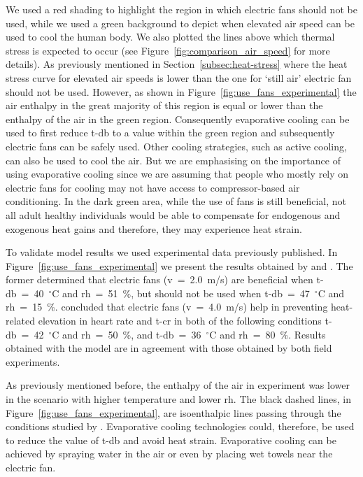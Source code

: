 We used a red shading to highlight the region in which electric fans should not be used, while we used a green background to depict when elevated air speed can be used to cool the human body.
We also plotted the lines above which thermal stress is expected to occur (see Figure~\ref{fig:comparison_air_speed} for more details).
As previously mentioned in Section~\ref{subsec:heat-stress} where the heat stress curve for elevated air speeds is lower than the one for `still air' electric fan should not be used.
 However, as shown in Figure~\ref{fig:use_fans_experimental} the air enthalpy in the great majority of this region is equal or lower than the enthalpy of the air in the green region.
 Consequently evaporative cooling can be used to first reduce \ac{t-db} to a value within the green region and subsequently electric fans can be safely used.
 Other cooling strategies, such as active cooling, can also be used to cool the air.
 But we are emphasising on the importance of using evaporative cooling since we are assuming that people who mostly rely on electric fans for cooling may not have access to compressor-based air conditioning.
In the dark green area, while the use of fans is still beneficial, not all adult healthy individuals would be able to compensate for endogenous and exogenous heat gains and therefore, they may experience heat strain.

To validate  model results we used experimental data previously published.
In Figure~\ref{fig:use_fans_experimental} we present the results obtained by  and .
The former determined that electric fans (\ac{v}~=~2.0~m/s) are beneficial when \ac{t-db}~=~40~$^{\circ}$C and \ac{rh}~=~51~\%, but should not be used when \ac{t-db}~=~47~$^{\circ}$C and \ac{rh}~=~15~\%.
 concluded that electric fans (\ac{v}~=~4.0~m/s) help in preventing heat-related elevation in heart rate and \ac{t-cr} in both of the following conditions \ac{t-db}~=~42~$^{\circ}$C and \ac{rh}~=~50~\%, and \ac{t-db}~=~36~$^{\circ}$C and \ac{rh}~=~80~\%.
Results obtained with the  model are in agreement with those obtained by both field experiments.

As previously mentioned before, the enthalpy of the air in  experiment was lower in the scenario with higher temperature and lower \ac{rh}.
The black dashed lines, in Figure~\ref{fig:use_fans_experimental}, are isoenthalpic lines passing through the conditions studied by .
Evaporative cooling technologies could, therefore, be used to reduce the value of \ac{t-db} and avoid heat strain.
Evaporative cooling can be achieved by spraying water in the air or even by placing wet towels near the electric fan.

